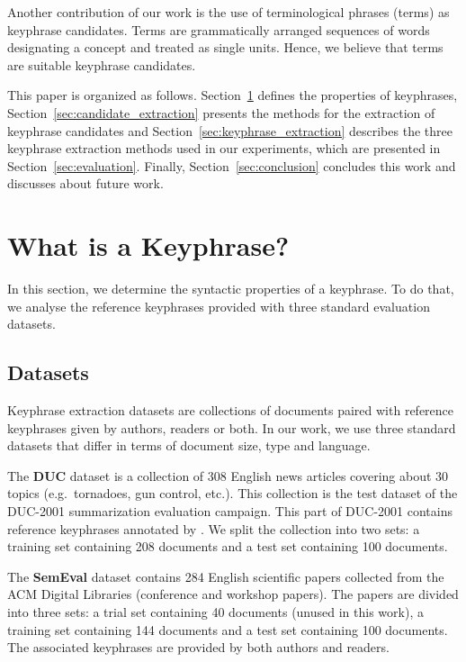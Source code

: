   Another contribution of our work is the use of terminological phrases (terms)
  as keyphrase candidates. Terms are grammatically arranged sequences of
  words designating a concept and treated as single units. Hence, we believe
  that terms are suitable keyphrase candidates.

  This paper is organized as follows.
  Section~\ref{sec:definition_of_candidate_keyphrases} defines the properties of
  keyphrases, Section~\ref{sec:candidate_extraction} presents the methods for
  the extraction of keyphrase candidates and
  Section~\ref{sec:keyphrase_extraction} describes the three keyphrase
  extraction methods used in our experiments, which are presented in
  Section~\ref{sec:evaluation}. Finally, Section~\ref{sec:conclusion} concludes
  this work and discusses about future work.

\section{What is a Keyphrase?}
\label{sec:definition_of_candidate_keyphrases}
  In this section, we determine the syntactic properties of a keyphrase. To do
  that, we analyse the reference keyphrases provided with three standard
  evaluation datasets.

  \subsection{Datasets}
  \label{subsec:keyphrase_extraction_datasets}
    Keyphrase extraction datasets are collections of documents paired with
    reference keyphrases given by authors, readers or both. In our work, we use
    three standard datasets that differ in terms of document size,  type and
    language.

    The \textbf{DUC} dataset \cite{over2001duc} is a collection of 308 English
    news articles covering about 30 topics (e.g.~tornadoes, gun control, etc.).
    This collection is the test dataset of the DUC-2001 summarization evaluation
    campaign. This part of DUC-2001 contains reference keyphrases annotated by
    . We split the collection into two sets: a
    training set containing 208 documents and a test set containing 100
    documents.

    The \textbf{SemEval} dataset \cite{kim2010semeval} contains 284 English
    scientific papers collected from the ACM Digital Libraries (conference and
    workshop papers). The papers are divided into three sets: a trial set
    containing 40 documents (unused in this work), a training set containing 144
    documents and a test set containing 100 documents. The associated keyphrases
    are provided by both authors and readers.

